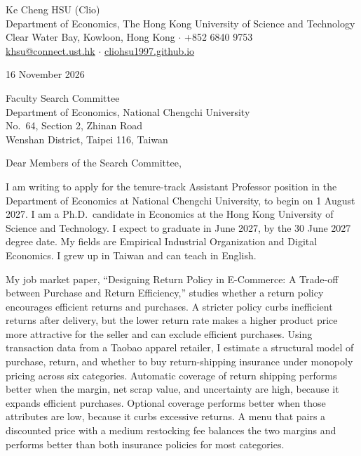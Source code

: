 \documentclass[11pt]{article}
\begin{document}
\begin{flushleft}
Ke Cheng HSU (Clio) \\
Department of Economics, The Hong Kong University of Science and Technology \\
Clear Water Bay, Kowloon, Hong Kong $\cdot$ +852 6840 9753 \\
\href{mailto:khsu@connect.ust.hk}{khsu@connect.ust.hk} $\cdot$ \href{https://cliohsu1997.github.io/}{cliohsu1997.github.io}
\end{flushleft}

16 November 2026

\vspace{0.1em}
Faculty Search Committee \\
Department of Economics, National Chengchi University \\
No.\ 64, Section 2, Zhinan Road \\
Wenshan District, Taipei 116, Taiwan

\vspace{0.1em}
Dear Members of the Search Committee,

I am writing to apply for the tenure-track Assistant Professor position in the Department of Economics at National Chengchi University, to begin on 1 August 2027. I am a Ph.D.\ candidate in Economics at the Hong Kong University of Science and Technology. I expect to graduate in June 2027, by the 30 June 2027 degree date. My fields are Empirical Industrial Organization and Digital Economics. I grew up in Taiwan and can teach in English.

My job market paper, ``Designing Return Policy in E-Commerce: A Trade-off between Purchase and Return Efficiency,'' studies whether a return policy encourages efficient returns and purchases. A stricter policy curbs inefficient returns after delivery, but the lower return rate makes a higher product price more attractive for the seller and can exclude efficient purchases. Using transaction data from a Taobao apparel retailer, I estimate a structural model of purchase, return, and whether to buy return-shipping insurance under monopoly pricing across six categories. Automatic coverage of return shipping performs better when the margin, net scrap value, and uncertainty are high, because it expands efficient purchases. Optional coverage performs better when those attributes are low, because it curbs excessive returns. A menu that pairs a discounted price with a medium restocking fee balances the two margins and performs better than both insurance policies for most categories.
\end{document}
